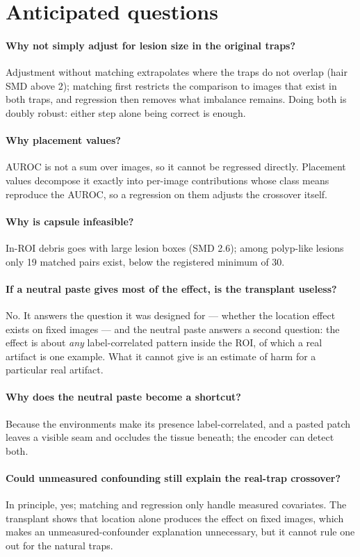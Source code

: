 \section{Anticipated questions}
\paragraph{Why not simply adjust for lesion size in the original traps?} Adjustment without matching extrapolates
where the traps do not overlap (hair SMD above 2); matching first restricts the comparison to images that exist in both
traps, and regression then removes what imbalance remains. Doing both is doubly robust: either step alone being correct
is enough.
\paragraph{Why placement values?} AUROC is not a sum over images, so it cannot be regressed directly. Placement values
decompose it exactly into per-image contributions whose class means reproduce the AUROC, so a regression on them adjusts
the crossover itself.
\paragraph{Why is capsule infeasible?} In-ROI debris goes with large lesion boxes (SMD 2.6); among polyp-like lesions
only 19 matched pairs exist, below the registered minimum of 30.
\paragraph{If a neutral paste gives most of the effect, is the transplant useless?} No. It answers the question it was
designed for --- whether the location effect exists on fixed images --- and the neutral paste answers a second question:
the effect is about \emph{any} label-correlated pattern inside the ROI, of which a real artifact is one example. What it
cannot give is an estimate of harm for a particular real artifact.
\paragraph{Why does the neutral paste become a shortcut?} Because the environments make its presence label-correlated,
and a pasted patch leaves a visible seam and occludes the tissue beneath; the encoder can detect both.
\paragraph{Could unmeasured confounding still explain the real-trap crossover?} In principle, yes; matching and
regression only handle measured covariates. The transplant shows that location alone produces the effect on fixed
images, which makes an unmeasured-confounder explanation unnecessary, but it cannot rule one out for the natural traps.
